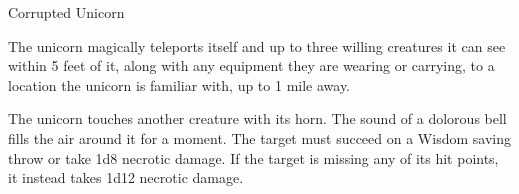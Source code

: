 \begin{DndMonster}[width=0.5\textwidth]{Corrupted Unicorn}
	\DndMonsterAttack[
		name=Horn,
		distance=melee, %
		mod=+7,
		reach=5,
		targets=one target,
		dmg=\DndDice{1d8 + 4},
		dmg-type=piercing,
	]
	
	The unicorn magically teleports itself and up to three willing creatures it can see within 5 feet of it, along with any equipment they are wearing or carrying, to a location the unicorn is familiar with, up to 1 mile away.
	
	The unicorn touches another creature with its horn. The sound of a dolorous bell fills the air around it for a moment. The target must succeed on a Wisdom saving throw or take 1d8 necrotic damage. If the target is missing any of its hit points, it instead takes 1d12 necrotic damage.
\end{DndMonster}